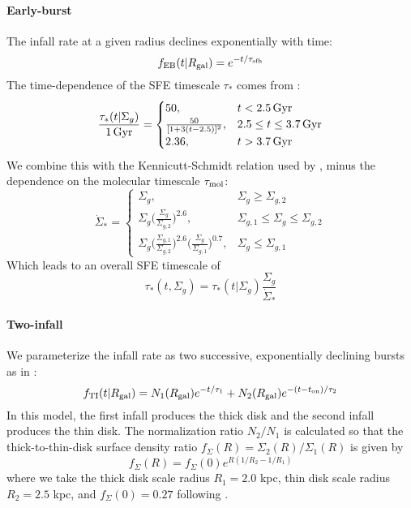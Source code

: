 \documentclass[twocolumn,linenumbers,twocolappendix]{aastex631}
\begin{document}
\paragraph{Early-burst} The infall rate at a given radius declines exponentially with time:
\begin{equation}
    f_{\rm EB}(t|R_{\rm gal}) = e^{-t/\tau_{\rm sfh}}
    \label{eq:earlyburst-ifr}
\end{equation}
The time-dependence of the SFE timescale $\tau_*$ comes from \citet{Conroy2022-ThickDisk}:
\begin{equation}
    \frac{\tau_*(t|\Sigma_g)}{1\,\rm{Gyr}} =
    \begin{cases}
        50, & t < 2.5\,\rm{Gyr} \\
        \frac{50}{[1+3(t-2.5)]^2}, & 2.5\leq t \leq 3.7\,\rm{Gyr} \\
        2.36, & t > 3.7\,\rm{Gyr}
    \end{cases}
    \label{eq:earlyburst-conroy22}
\end{equation}
We combine this with the Kennicutt-Schmidt relation used by \citet{Johnson2021-Migration}, minus the dependence on the molecular timescale $\tau_{\rm mol}$:
\begin{equation}
    \dot \Sigma_* = 
    \begin{cases}
        \Sigma_g, & \Sigma_g \geq \Sigma_{g,2} \\
        \Sigma_g \Big(\frac{\Sigma_g}{\Sigma_{g,2}}\Big)^{2.6}, & \Sigma_{g,1} \leq \Sigma_g \leq \Sigma_{g,2} \\
        \Sigma_g \Big(\frac{\Sigma_{g,1}}{\Sigma_{g,2}}\Big)^{2.6} \Big(\frac{\Sigma_g}{\Sigma_{g,1}}\Big)^{0.7}, & \Sigma_g \leq \Sigma_{g,1}
    \end{cases}
    \label{eq:kennicutt-schmidt}
\end{equation}
Which leads to an overall SFE timescale of
\begin{equation}
    \tau_*(t,\Sigma_g) = \tau_*(t|\Sigma_g) \frac{\Sigma_g}{\dot \Sigma_*}
    \label{eq:earlyburst-taustar}
\end{equation}

\paragraph{Two-infall} 
We parameterize the infall rate as two successive, exponentially declining bursts as in \citet{Chiappini2001-AbundanceGradients}:
\begin{equation}
    \label{eq:twoinfall-ifr}
    f_{\rm TI}(t|R_{\rm gal}) = N_1(R_{\rm gal}) e^{-t/\tau_1} + N_2(R_{\rm gal}) e^{-(t-t_{\rm on})/\tau_2}
\end{equation}
In this model, the first infall produces the thick disk and the second infall produces the thin disk. The normalization ratio $N_2/N_1$ is calculated so that the thick-to-thin-disk surface density ratio $f_\Sigma(R)=\Sigma_2(R)/\Sigma_1(R)$ is given by
\begin{equation}
    f_\Sigma(R) = f_\Sigma(0) e^{R(1/R_2 - 1/R_1)}
\end{equation}
where we take the thick disk scale radius $R_1=2.0$ kpc, thin disk scale radius $R_2=2.5$ kpc, and $f_\Sigma(0)=0.27$ following \citet{BlandHawthornGerhard2016-MilkyWayReview}.
\end{document}
